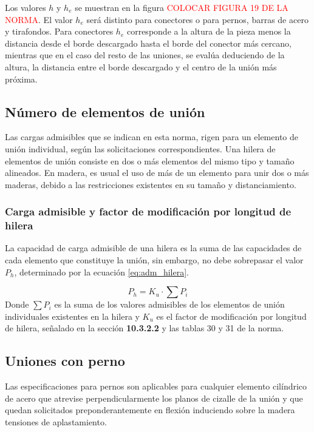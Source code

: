 Los valores $h$ y $h_e$ se muestran en la figura \textcolor{red}{COLOCAR FIGURA 19 DE LA NORMA}. El valor $h_e$ será distinto para conectores o para pernos, barras de acero y tirafondos. Para conectores $h_e$ corresponde a la altura de la pieza menos la distancia desde el borde descargado hasta el borde del conector más cercano, mientras que en el caso del resto de las uniones, se evalúa deduciendo de la altura, la distancia entre el borde descargado y el centro de la unión más próxima.

\subsection{Número de elementos de unión}
Las cargas admisibles que se indican en esta norma, rigen para un elemento de unión individual, según las solicitaciones correspondientes. Una hilera de elementos de unión consiste en dos o más elementos del mismo tipo y tamaño alineados. En madera, es usual el uso de más de un elemento para unir dos o más maderas, debido a las restricciones existentes en su tamaño y distanciamiento.

\subsubsection{Carga admisible y factor de modificación por longitud de hilera}
La capacidad de carga admisible de una hilera es la suma de las capacidades de cada elemento que constituye la unión, sin embargo, no debe sobrepasar el valor $P_h$, determinado por la ecuación \ref{eq:adm_hilera}.

\begin{equation}\label{eq:adm_hilera}
	P_h = K_u \cdot \sum P_i
\end{equation}
Donde $\sum P_i$ es la suma de los valores admisibles de los elementos de unión individuales existentes en la hilera y $K_u$ es el factor de modificación por longitud de hilera, señalado en la sección \textbf{10.3.2.2} y las tablas 30 y 31 de la norma.

\subsection{Uniones con perno}
\label{sec:union_perno}
Las especificaciones para pernos son aplicables para cualquier elemento cilíndrico de acero que atrevise perpendicularmente los planos de cizalle de la unión y que quedan solicitados preponderantemente en flexión induciendo sobre la madera tensiones de aplastamiento.


